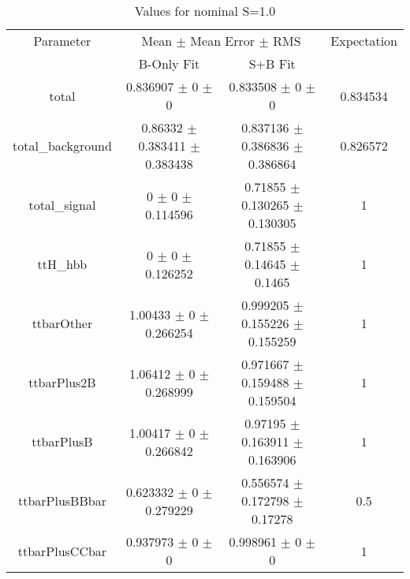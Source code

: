 \begin{table}
\centering
\caption{Values for nominal S=1.0}
\begin{tabular}{cccc}
\toprule
Parameter & \multicolumn{2}{c}{Mean $\pm$ Mean Error $\pm$ RMS} & Expectation\\
 & B-Only Fit & S+B Fit & \\
\midrule
total & \num{0.836907} $\pm$ \num{0} $\pm$ \num{0} & \num{0.833508} $\pm$ \num{0} $\pm$ \num{0} & \num{0.834534}\\
total\_background & \num{0.86332} $\pm$ \num{0.383411} $\pm$ \num{0.383438} & \num{0.837136} $\pm$ \num{0.386836} $\pm$ \num{0.386864} & \num{0.826572}\\
total\_signal & \num{0} $\pm$ \num{0} $\pm$ \num{0.114596} & \num{0.71855} $\pm$ \num{0.130265} $\pm$ \num{0.130305} & \num{1}\\
ttH\_hbb & \num{0} $\pm$ \num{0} $\pm$ \num{0.126252} & \num{0.71855} $\pm$ \num{0.14645} $\pm$ \num{0.1465} & \num{1}\\
ttbarOther & \num{1.00433} $\pm$ \num{0} $\pm$ \num{0.266254} & \num{0.999205} $\pm$ \num{0.155226} $\pm$ \num{0.155259} & \num{1}\\
ttbarPlus2B & \num{1.06412} $\pm$ \num{0} $\pm$ \num{0.268999} & \num{0.971667} $\pm$ \num{0.159488} $\pm$ \num{0.159504} & \num{1}\\
ttbarPlusB & \num{1.00417} $\pm$ \num{0} $\pm$ \num{0.266842} & \num{0.97195} $\pm$ \num{0.163911} $\pm$ \num{0.163906} & \num{1}\\
ttbarPlusBBbar & \num{0.623332} $\pm$ \num{0} $\pm$ \num{0.279229} & \num{0.556574} $\pm$ \num{0.172798} $\pm$ \num{0.17278} & \num{0.5}\\
ttbarPlusCCbar & \num{0.937973} $\pm$ \num{0} $\pm$ \num{0} & \num{0.998961} $\pm$ \num{0} $\pm$ \num{0} & \num{1}\\
\bottomrule
\end{tabular}
\end{table}